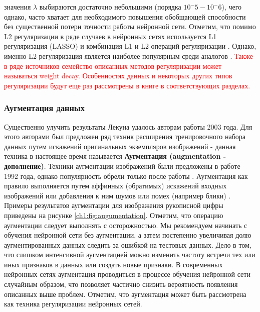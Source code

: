 \documentclass[12pt]{article}
\begin{document}
\begin{sloppypar}
значения $\lambda$ выбираются достаточно небольшими (порядка $10^-5 - 10^-6$), чего однако, часто хватает для необходимого повышения обобщающей способности без существенной потери точности работы нейронной сети.  
Отметим, что помимо L2 регуляризации в ряде случаев в нейронных сетях используется L1 регуляризация (LASSO) \cite{tibshirani1996regression} и комбинация L1 и L2 операций регуляризации \cite{ zou2005regularization}. Однако, именно L2 регуляризация является наиболее популярным среди аналогов \cite{moradi2020survey}. \textcolor{red}{Также в ряде источников семейство описанных методов регуляризации может называться weight decay.
Особенностях данных  и некоторых других типов регуляризации будут еще раз рассмотрены в книге в соответствующих разделах.  }

\subsubsection{Аугментация данных}
Существенно улучить результаты Лекуна удалось авторам работы \cite{simard2003best} 2003 года. Для этого авторами был предложен ряд техник расширения тренировочного набора данных путем искажений оригинальных экземпляров изображений - данная техника в настоящее время называется \textbf{Аугментация (augmentation - дополнение)}. Техники аугментации изображений были предложены в работе \cite{baird1992document} 1992 года, однако популярность обрели только после работы \cite{simard2003best}. Аугментация как правило выполняется путем аффинных (обратимых) искажений входных изображений или добавления к ним шумов или помех (например блики) \cite{ shorten2019survey}. Примеры результатов аугментации для изображения рукописной цифры приведены на рисунке \ref{ch1:fig:augumentation}. Отметим, что операцию аугментации следует выполнять с осторожностью. Мы рекомендуем начинать с обучения нейронной сети без аугментации, а затем постепенно увеличивая долю аугментированных данных следить за ошибкой на тестовых данных. Дело в том, что слишком интенсивной аугментацией можно изменить частоту встречи тех или иных признаков в данных или создать новые признаки. В современных нейронных сетях аугментация проводиться в процессе обучения нейронной сети случайным образом, что позволяет частично снизить вероятность появления описанных выше проблем. Отметим, что аугментация может быть рассмотрена как техника регуляризации нейронных сетей.


\end{sloppypar}
\end{document}
